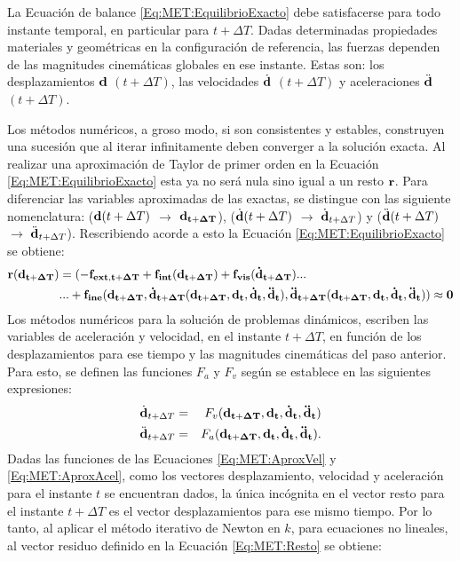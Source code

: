 La Ecuación de balance \eqref{Eq:MET:EquilibrioExacto} debe satisfacerse para todo instante temporal, en particular para $t+\Delta T$. Dadas determinadas propiedades materiales y geométricas en la configuración de referencia, las fuerzas dependen de las magnitudes cinemáticas globales en ese instante. Estas son: los desplazamientos $\bf{d}$ $(t+\Delta T)$, las velocidades $\dot{\bf{d}}$ $(t+\Delta T)$ y aceleraciones $\ddot{\bf{d}}$ $(t+\Delta T)$.

Los métodos numéricos, a groso modo, si son consistentes y estables, construyen una sucesión que al iterar infinitamente deben converger a la solución exacta. Al realizar una aproximación de Taylor de primer orden en la Ecuación \eqref{Eq:MET:EquilibrioExacto} esta ya no será nula sino igual a un resto $\bf{r}$. Para diferenciar las variables aproximadas de las exactas, se distingue con las siguiente nomenclatura: ($\bf{d}\text{$(t+\Delta T)$}$ $\rightarrow$ $\bf{d}_{t+\Delta T}$), ($\dot{\bf{d}}\text{$(t+\Delta T)$}$ $\rightarrow$ $\dot{\bf{d}}_{t+\Delta T}$) y ($\ddot{\bf{d}}\text{$(t+\Delta T)$}$ $\rightarrow$ $\ddot{\bf{d}}_{t+\Delta T}$). Rescribiendo acorde a esto la Ecuación \eqref{Eq:MET:EquilibrioExacto} se obtiene:
\begin{equation}\label{Eq:MET:Resto}
\begin{split}
	\bf{r}(\bf{d}_{t+\Delta T})&=(-\bf{f}_{ext,t+\Delta T}+\bf{f}_{int}(\bf{d}_{t+\Delta T})+\bf{f}_{vis}(\dot{\bf{d}}_{t+\Delta T})...\\	
	&...+\bf{f}_{ine}(\bf{d_{t+\Delta T}},\dot{\bf{d}}_{t+\Delta T}(d_{t+\Delta T},\bf{d_t},\bf{\dot{d}_t},\bf{\ddot{d}_t}),
	\ddot{\bf{d}}_{t+\Delta T}(d_{t+\Delta T},\bf{d_t},\bf{\dot{d}_t},\bf{\ddot{d}_t}))
	\approx 0
\end{split}
\end{equation}
Los métodos numéricos para la solución de problemas dinámicos, escriben las variables de aceleración y velocidad, en el instante $t +\Delta T$, en función de los desplazamientos para ese tiempo y las magnitudes cinemáticas del paso anterior. Para esto, se definen las funciones $F_a$ y $F_v$ según se establece en las siguientes expresiones:
\begin{eqnarray}\label{Eq:MET:AproxVel}
\dot{\bf{d}}_{t+\Delta T}&=&F_v(\bf{d_{t+\Delta T}},\bf{d_t},\bf{\dot{d}_t},\bf{\ddot{d}_t})\\
\label{Eq:MET:AproxAcel}
\ddot{\bf{d}}_{t+\Delta T}&=&F_a(\bf{d_{t+\Delta T}},\bf{d_t},\bf{\dot{d}_t},\bf{\ddot{d}_t}).
\end{eqnarray}
Dadas las funciones de las Ecuaciones \eqref{Eq:MET:AproxVel} y \eqref{Eq:MET:AproxAcel}, como los vectores desplazamiento, velocidad y aceleración para el instante $t$ se encuentran dados, la única incógnita en el vector resto para el instante $t+\Delta T$ es el vector desplazamientos para ese mismo tiempo. Por lo tanto, al aplicar el método iterativo de Newton en $k$, para ecuaciones no lineales, al vector residuo definido en la Ecuación \eqref{Eq:MET:Resto} se obtiene:


